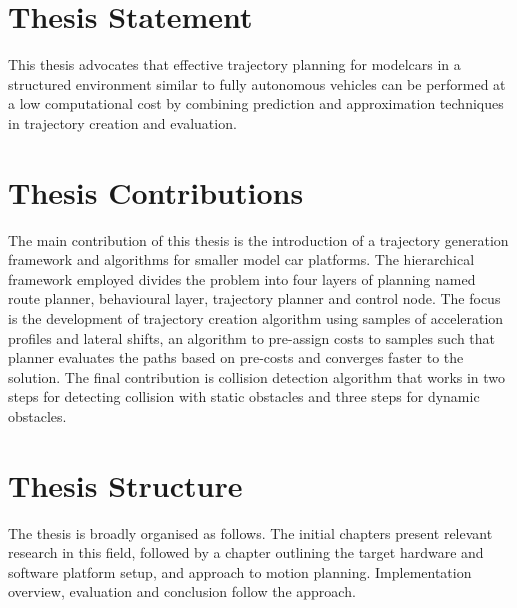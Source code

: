 

\section{Thesis Statement}

This thesis advocates that effective trajectory planning for modelcars in a structured environment similar to fully autonomous vehicles can be performed at a low computational cost by combining prediction and approximation techniques in trajectory creation and evaluation.

\section{Thesis Contributions}

The main contribution of this thesis is the introduction of a trajectory generation framework and algorithms for smaller model car platforms. The hierarchical framework employed divides the problem into four layers of planning named route planner, behavioural layer, trajectory planner and control node. The focus is the development of trajectory creation algorithm using samples of acceleration profiles and lateral shifts, an algorithm to pre-assign costs to samples such that planner evaluates the paths based on pre-costs and converges faster to the solution. The final contribution is collision detection algorithm that works in two steps for detecting collision with static obstacles and three steps for dynamic obstacles. 

\section{Thesis Structure}


The thesis is broadly organised as follows. The initial chapters present relevant research in this field, followed by a chapter outlining the target hardware and software platform setup, and approach to motion planning. Implementation overview, evaluation and conclusion follow the approach.

